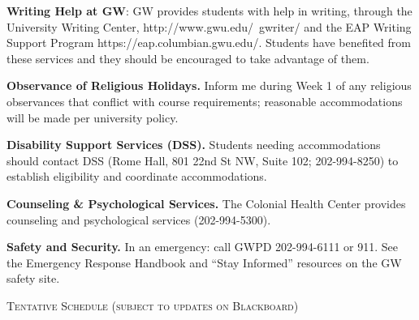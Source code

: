 \documentclass[11pt]{article}
\begin{document}
\smallskip
\textbf{Writing Help at GW}: GW provides students with help in writing, through the University Writing Center, http://www.gwu.edu/~gwriter/ and the EAP Writing Support Program https://eap.columbian.gwu.edu/.  Students have benefited from these services and they should be encouraged to take advantage of them.

\smallskip
\textbf{Observance of Religious Holidays.} Inform me during Week 1 of any religious observances that conflict with course requirements; reasonable accommodations will be made per university policy.

\smallskip
\textbf{Disability Support Services (DSS).} Students needing accommodations should contact DSS (Rome Hall, 801 22nd St NW, Suite 102; 202-994-8250) to establish eligibility and coordinate accommodations.

\smallskip
\textbf{Counseling \& Psychological Services.} The Colonial Health Center provides counseling and psychological services (202-994-5300).

\smallskip
\textbf{Safety and Security.} In an emergency: call GWPD 202-994-6111 or 911. See the Emergency Response Handbook and “Stay Informed” resources on the GW safety site.

\bigskip

\noindent\textsc{Tentative Schedule (subject to updates on Blackboard)}
\end{document}
